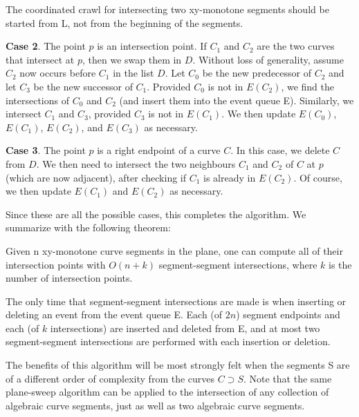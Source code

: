 
The coordinated crawl for intersecting two xy-monotone segments should be started from L, not 
from the beginning of the segments.

{\bf Case 2}. The point $p$ is an intersection point.
If $C_{1}$ and $C_{2}$ are the two curves that intersect at $p$, then we swap them
in $D$.  Without loss of generality, assume $C_{2}$ now occurs before $C_{1}$ in the
list $D$.  Let $C_{0}$ be the new predecessor of $C_{2}$ and let $C_{3}$ be the 
new successor of $C_{1}$.
Provided $C_{0}$ is not in $E(C_{2})$, we find the intersections of $C_{0}$ and $C_{2}$
(and insert them into the event queue E).
Similarly, we intersect $C_{1}$ and $C_{3}$, provided $C_{3}$ is not in $E(C_{1})$. 
We then update $E(C_{0})$, $E(C_{1})$, $E(C_{2})$, and $E(C_{3})$ as necessary.

{\bf Case 3}.  The point $p$ is a right endpoint of a curve $C$.
In this case, we delete $C$ from $D$.
We then need to intersect the two neighbours $C_{1}$ and $C_{2}$ of $C$ at $p$
(which are now adjacent), after checking if $C_{1}$ is already in $E(C_{2})$.
Of course, we then update $E(C_{1})$ and  $E(C_{2})$ as necessary.

Since these are all the possible cases, this completes the algorithm.
We summarize with the following theorem:
\clearpage
\begin{theorem}
Given n xy-monotone curve segments in the plane, one can compute all of their 
intersection points with $O(n+k)$ segment-segment intersections, 
where $k$ is the number of intersection points.
\end{theorem}
The only time that segment-segment intersections are made is when inserting or deleting an
event from the event queue E.
Each (of $2n$) segment endpoints and each (of $k$ intersections) are inserted and deleted from E,
and at most two segment-segment intersections are performed with each insertion or deletion.
\QED

The benefits of this algorithm will be most strongly felt when the segments S are of 
a different order of complexity from the curves $C \supset S$.
Note that the same plane-sweep algorithm can be applied to the intersection of any 
collection of algebraic curve segments, just as well as two algebraic curve segments.

